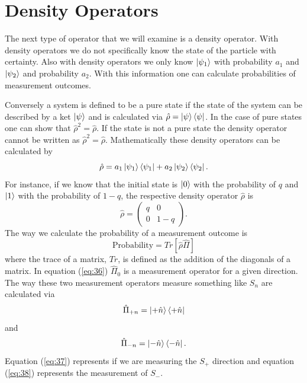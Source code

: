 \documentclass[twocolumn]{article}
\begin{document}
\section*{Density Operators}
The next type of operator that we will examine is a density operator. With density operators we do not specifically know the state of the particle with certainty. Also with density operators we only know $\ket{\psi_1}$ with probability $a_1$ and $\ket{\psi_2}$ and probability $a_2$. With this information one can calculate probabilities of measurement outcomes. 

Conversely a system is defined to be a pure state if the state of the system can be described by a ket $\ket{\psi}$ and is calculated via $\hat{\rho}=\ket{\psi}\bra{\psi}$. In the case of pure states one can show that $\hat{\rho}^2=\hat{\rho}$. If the state is not a pure state the density operator cannot be written as $\hat{\rho}^2=\hat{\rho}$. Mathematically these density operators can be calculated by
\begin{equation} \label{eq:34}
\hat{\rho}=a_1\ket{\psi_1}\bra{\psi_1}+a_2\ket{\psi_2}\bra{\psi_2}.
\end{equation}
For instance, if we know that the initial state is $\ket{0}$ with the probability of $q$ and $\ket{1}$ with the probability of $1-q$, the respective density operator $\hat{\rho}$ is
\begin{equation} \label{eq:35}
\hat{\rho}=
\begin{pmatrix}
q & 0 \\
0 & 1-q
\end{pmatrix}.
\end{equation}
The way we calculate the probability of a measurement outcome is
\begin{equation} \label{eq:36}
\text{Probability}=Tr[\hat{\rho}\hat{\Pi}]
\end{equation}
where the trace of a matrix, $Tr$, is defined as the addition of the diagonals of a matrix. In equation (\ref{eq:36}) $\hat{\Pi}_0$ is a measurement operator for a given direction. The way these two measurement operators measure something like $S_n$ are calculated via
\begin{equation}\label{eq:37}
\hat{\Pi}_{+n}=\ket{+\hat{n}}\bra{+\hat{n}}
\end{equation}
and
\begin{equation}\label{eq:38}
\hat{\Pi}_{-n}=\ket{-\hat{n}}\bra{-\hat{n}}.
\end{equation}
Equation (\ref{eq:37}) represents if we are measuring the $S_+$ direction and equation (\ref{eq:38}) represents the measurement of $S_-$.
\end{document}
